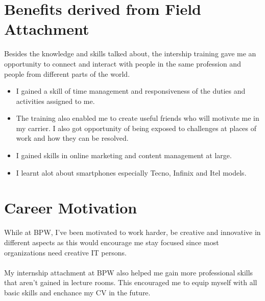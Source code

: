 \section{Benefits derived from Field Attachment}
Besides the knowledge and skills talked about, the intership training gave me an opportunity to connect and interact with people in the same profession and people from different parts of the world.
\begin{itemize}
\item I gained a skill of time management and responsiveness of the duties and
activities assigned to me.
\item The training also enabled me to create useful friends who will motivate me in my carrier. I also got opportunity of being exposed to challenges at places of work and how they can be resolved.
\item I gained skills in online marketing and content management at large.
\item I learnt alot about smartphones especially Tecno, Infinix and Itel models.
\end{itemize} 
\section{Career Motivation}
While at BPW, I've been motivated to work harder, be creative and innovative in
different aspects as this would encourage me stay focused since most organizations
need creative IT persons.\\ \\
My internship attachment at BPW also helped me gain more professional skills that aren't gained in lecture rooms. This encouraged me to equip myself with all basic skills and enchance my CV in the future.
